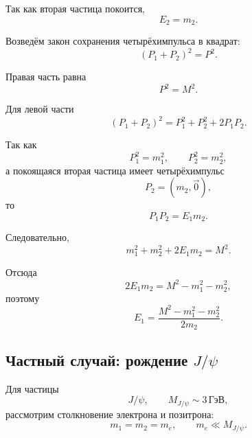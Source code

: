 \documentclass[../final.tex]{subfiles}
\begin{document}
Так как вторая частица покоится,
%
\begin{equation*}
    E_2=m_2.
\end{equation*}

Возведём закон сохранения четырёхимпульса в квадрат:
%
\begin{equation*}
    (P_1+P_2)^2
    =
    P^2.
\end{equation*}

Правая часть равна
%
\begin{equation*}
    P^2=M^2.
\end{equation*}

Для левой части
%
\begin{equation*}
    (P_1+P_2)^2
    =
    P_1^2+P_2^2+2P_1P_2.
\end{equation*}

Так как
%
\begin{equation*}
    P_1^2=m_1^2,
    \qquad
    P_2^2=m_2^2,
\end{equation*}
%
а покоящаяся вторая частица имеет четырёхимпульс
%
\begin{equation*}
    P_2=(m_2,\vec 0),
\end{equation*}
%
то
%
\begin{equation*}
    P_1P_2
    =
    E_1m_2.
\end{equation*}

Следовательно,
%
\begin{equation*}
    m_1^2+m_2^2+2E_1m_2
    =
    M^2.
\end{equation*}

Отсюда
%
\begin{equation*}
    2E_1m_2
    =
    M^2-m_1^2-m_2^2,
\end{equation*}
%
поэтому
%
\begin{equation*}
    E_1
    =
    \frac{
        M^2-m_1^2-m_2^2
    }{
        2m_2
    }.
\end{equation*}



\subsection*{Частный случай: рождение $J/\psi$}

Для частицы
%
\begin{equation*}
    J/\psi,
    \qquad
    M_{J/\psi}
    \sim
    3\,\text{ГэВ},
\end{equation*}
%
рассмотрим столкновение электрона и позитрона:
%
\begin{equation*}
    m_1=m_2=m_e,
    \qquad
    m_e\ll M_{J/\psi}.
\end{equation*}
\end{document}

